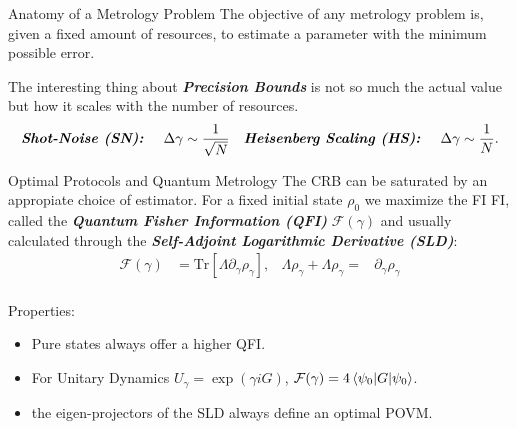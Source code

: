 \documentclass[final]{beamer}
\newlength{\colwidth}
\begin{document}
\begin{frame}[t]
\begin{columns}[t]
\begin{column}{\colwidth}
 \begin{block}{Anatomy of a Metrology Problem}
   The objective of any metrology problem is, given a fixed amount of resources, to estimate a parameter with the minimum possible error.
   \vspace{-0.07\linewidth}
   
   \vspace{-0.11\linewidth}
   The interesting thing about  \textbf{\textit{Precision Bounds}} is not so much the actual value but how it scales with the number of
   resources.
  \begin{align*}
    \text{\textbf{\textit{Shot-Noise (SN):}}}\hspace{0.5cm} \Delta \gamma &\sim \frac{1}{\sqrt{N}} &
                                                                                                            \text{\textbf{\textit{Heisenberg Scaling (HS):}}} \hspace{0.5cm}\Delta \gamma \sim \frac{1}{N}.
  \end{align*}
 \end{block}
 \begin{block}{Optimal Protocols and Quantum Metrology}
  The CRB can be saturated by an appropiate choice of estimator. For a fixed initial state $\rho_{0}$ we maximize the FI
  FI, called the \textit{\textbf{Quantum Fisher Information (QFI)}} $\mathcal{F}(\gamma)$
   and usually calculated through the \textit{\textbf{Self-Adjoint Logarithmic Derivative (SLD)}}:
  \begin{align*}
     \mathcal{F}(\gamma) &= \mathrm{Tr}[\Lambda \partial_{\gamma}\rho_{\gamma}], & \Lambda \rho_{\gamma} + \Lambda \rho_{\gamma} =& \partial_{\gamma} \rho_{\gamma}
  \end{align*}
   \\
  Properties:
\begin{itemize}
        \item Pure states always offer a higher QFI.
        \item For Unitary Dynamics $U_{\gamma}=\exp({\gamma iG})$, $\mathcal{F}(\gamma)=4\braket{\psi_{0} | G | \psi_{0}}$.
        \item the eigen-projectors of the SLD always define an optimal POVM.
\end{itemize}
\end{block}



\end{column}
\end{columns}
\end{frame}
\end{document}
